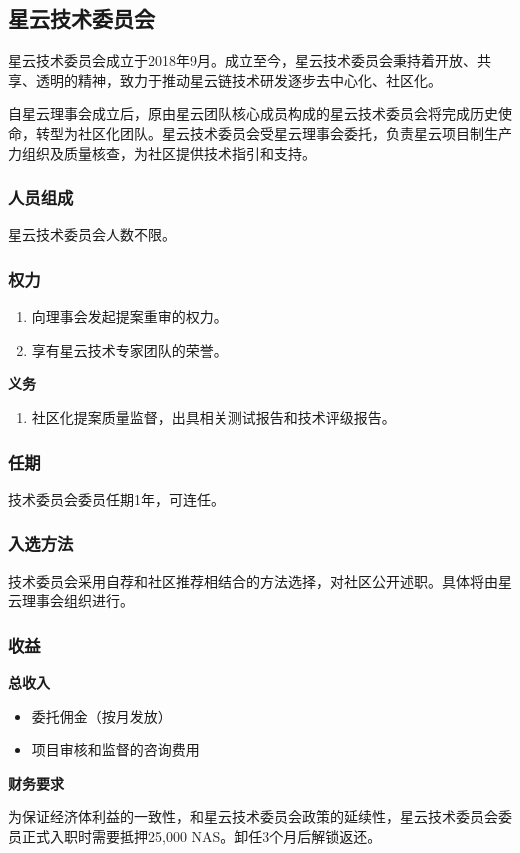 \subsection{星云技术委员会}

星云技术委员会成立于2018年9月。成立至今，星云技术委员会秉持着开放、共享、透明的精神，致力于推动星云链技术研发逐步去中心化、社区化。

自星云理事会成立后，原由星云团队核心成员构成的星云技术委员会将完成历史使命，转型为社区化团队。星云技术委员会受星云理事会委托，负责星云项目制生产力组织及质量核查，为社区提供技术指引和支持。

\subsubsection{人员组成}

星云技术委员会人数不限。

\subsubsection{权力}

\begin{enumerate}
	\item 向理事会发起提案重审的权力。
	\item 享有星云技术专家团队的荣誉。
\end{enumerate}

\textbf{义务}

\begin{enumerate}
	\item 社区化提案质量监督，出具相关测试报告和技术评级报告。
\end{enumerate}

\subsubsection{任期}

技术委员会委员任期1年，可连任。

\subsubsection{入选方法}

技术委员会采用自荐和社区推荐相结合的方法选择，对社区公开述职。具体将由星云理事会组织进行。

\subsubsection{收益}

\textbf{总收入}

\begin{itemize}
	\item 委托佣金（按月发放）
	\item 项目审核和监督的咨询费用
\end{itemize}

\textbf{财务要求}

为保证经济体利益的一致性，和星云技术委员会政策的延续性，星云技术委员会委员正式入职时需要抵押25,000 NAS。卸任3个月后解锁返还。